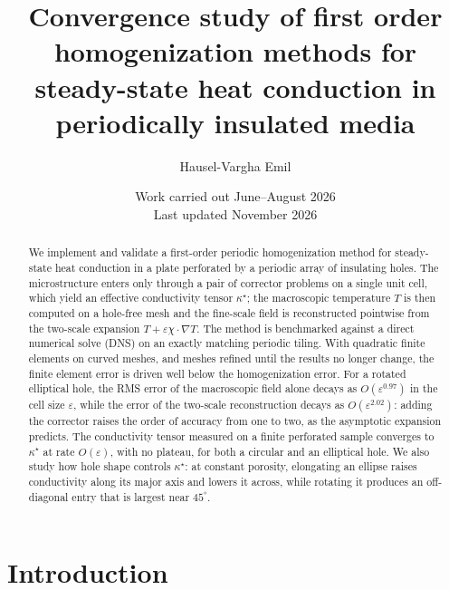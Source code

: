 \documentclass{article}
\begin{document}
\title{Convergence study of first order homogenization methods for
steady-state heat conduction in periodically insulated media}

\author{ Hausel-Vargha Emil}

\date{Work carried out June--August 2026\\
Last updated November 2026}

\maketitle

\begin{abstract}
We implement and validate a first-order periodic homogenization method for
steady-state heat conduction in a plate perforated by a periodic array of
insulating holes. The microstructure enters only through a pair of corrector
problems on a single unit cell, which yield an effective conductivity tensor
$\kappa^{\star}$; the macroscopic temperature $T$ is then computed on a hole-free
mesh and the fine-scale field is reconstructed pointwise from the two-scale
expansion $T+\varepsilon\chi\cdot\nabla T$. The method is benchmarked against a
direct numerical solve (DNS) on an exactly matching periodic tiling. With
quadratic finite elements on curved meshes, and meshes refined until the
results no longer change, the finite element error is driven well below the
homogenization error. For a rotated elliptical hole, the RMS error of the
macroscopic field alone decays as $O(\varepsilon^{0.97})$ in the cell size
$\varepsilon$, while the error of the two-scale reconstruction decays as
$O(\varepsilon^{2.02})$: adding the corrector raises the order of accuracy from one
to two, as the asymptotic expansion predicts. The conductivity tensor measured
on a finite perforated sample converges to $\kappa^{\star}$ at rate
$O(\varepsilon)$, with no plateau, for both a circular and an elliptical hole. We
also study how hole shape controls $\kappa^{\star}$: at constant porosity,
elongating an ellipse raises conductivity along its major axis and lowers it
across, while rotating it produces an off-diagonal entry that is largest near
$45^{\circ}$.
\end{abstract}

\clearpage
\tableofcontents
\clearpage

\section{Introduction}
\end{document}
